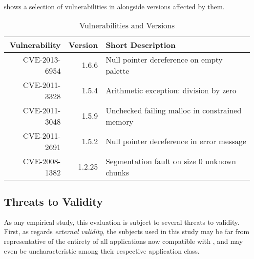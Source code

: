  shows a selection of vulnerabilities in \libpng alongside versions affected by
them.

\begin{table}[H]
\centering
\begin{tabular}{|r|r|l|}
\hline %
Vulnerability   & Version 	 	 & Short Description \\ \hline \hline 
CVE-2013-6954   & 1.6.6          & Null pointer dereference on empty palette \\ \hline %
CVE-2011-3328   & 1.5.4 		 & Arithmetic exception: division by zero   \\ \hline  %
CVE-2011-3048   & 1.5.9			 & Unchecked failing malloc in constrained memory \\ \hline %
CVE-2011-2691   & 1.5.2			 & Null pointer dereference in error message \\ \hline %
CVE-2008-1382   & 1.2.25 		 & Segmentation fault on size 0 unknown chunks \\ \hline %
\end{tabular}
\caption{Vulnerabilities and \libpng Versions}
\label{tbl:png:vulns}

\end{table}



\subsection{Threats to Validity}
As any empirical study, this evaluation is subject to several threats to validity.
First, as regards \emph{external validity}, the subjects used in this study may be far from representative of
the entirety of all applications now compatible with \xmlmate, and may even be uncharacteristic among their
respective application class.

